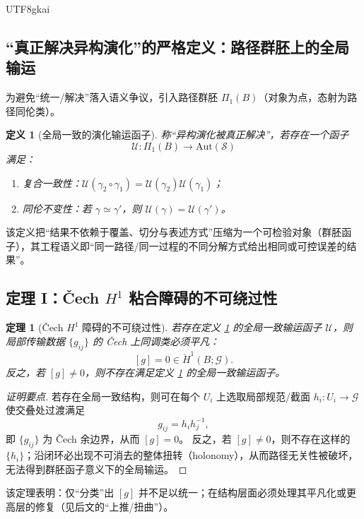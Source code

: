 \documentclass[12pt]{article}
\newtheorem{definition}{定义}[section]
\newtheorem{theorem}{定理}[section]
\begin{document}
\begin{CJK*}{UTF8}{gkai}
\subsection{“真正解决异构演化”的严格定义：路径群胚上的全局输运}

为避免“统一/解决”落入语义争议，引入路径群胚 $\Pi_1(B)$（对象为点，态射为路径同伦类）。

\begin{definition}[全局一致的演化输运函子]\label{def:global-transport}
称“异构演化被真正解决”，若存在一个函子
\[
  \mathcal{U}:\Pi_1(B)\to \mathrm{Aut}(\mathcal{S})
\]
满足：
\begin{enumerate}
  \item 复合一致性：$\mathcal{U}(\gamma_2\circ\gamma_1)=\mathcal{U}(\gamma_2)\mathcal{U}(\gamma_1)$；
  \item 同伦不变性：若 $\gamma\simeq\gamma'$，则 $\mathcal{U}(\gamma)=\mathcal{U}(\gamma')$。
\end{enumerate}
\end{definition}

该定义把“结果不依赖于覆盖、切分与表述方式”压缩为一个可检验对象（群胚函子），其工程语义即“同一路径/同一过程的不同分解方式给出相同或可控误差的结果”。

\subsection{定理 I：\v{C}ech $H^1$ 粘合障碍的不可绕过性}

\begin{theorem}[\v{C}ech $H^1$ 障碍的不可绕过性]\label{thm:cechH1-obstruction}
若存在定义 \ref{def:global-transport} 的全局一致输运函子 $\mathcal{U}$，则局部传输数据 $\{g_{ij}\}$ 的 \v{C}ech 上同调类必须平凡：
\[
  [g]=0\in \check H^1(B;\mathcal{G}).
\]
反之，若 $[g]\neq 0$，则不存在满足定义 \ref{def:global-transport} 的全局一致输运函子。
\end{theorem}

\begin{proof}[证明要点]
若存在全局一致结构，则可在每个 $U_i$ 上选取局部规范/截面 $h_i:U_i\to\mathcal{G}$ 使交叠处过渡满足
\[
  g_{ij}=h_i h_j^{-1},
\]
即 $\{g_{ij}\}$ 为 \v{C}ech 余边界，从而 $[g]=0$。
反之，若 $[g]\neq 0$，则不存在这样的 $\{h_i\}$；沿闭环必出现不可消去的整体扭转（holonomy），从而路径无关性被破坏，无法得到群胚函子意义下的全局输运。
\end{proof}

该定理表明：仅“分类”出 $[g]$ 并不足以统一；在结构层面必须处理其平凡化或更高层的修复（见后文的“上推/扭曲”）。


\end{CJK*}
\end{document}
